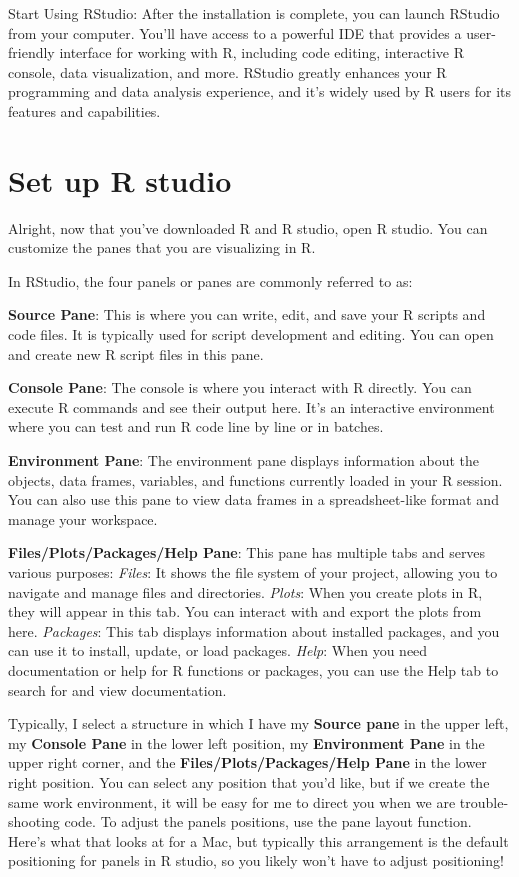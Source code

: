 \documentclass[
]{book}
\begin{document}
Start Using RStudio: After the installation is complete, you can launch RStudio from your computer. You'll have access to a powerful IDE that provides a user-friendly interface for working with R, including code editing, interactive R console, data visualization, and more. RStudio greatly enhances your R programming and data analysis experience, and it's widely used by R users for its features and capabilities.

\hypertarget{set-up-r-studio}{%
\section{Set up R studio}\label{set-up-r-studio}}

Alright, now that you've downloaded R and R studio, open R studio. You can customize the panes that you are visualizing in R.

In RStudio, the four panels or panes are commonly referred to as:

\textbf{Source Pane}: This is where you can write, edit, and save your R scripts and code files. It is typically used for script development and editing. You can open and create new R script files in this pane.

\textbf{Console Pane}: The console is where you interact with R directly. You can execute R commands and see their output here. It's an interactive environment where you can test and run R code line by line or in batches.

\textbf{Environment Pane}: The environment pane displays information about the objects, data frames, variables, and functions currently loaded in your R session. You can also use this pane to view data frames in a spreadsheet-like format and manage your workspace.

\textbf{Files/Plots/Packages/Help Pane}: This pane has multiple tabs and serves various purposes:
\emph{Files}: It shows the file system of your project, allowing you to navigate and manage files and directories.
\emph{Plots}: When you create plots in R, they will appear in this tab. You can interact with and export the plots from here.
\emph{Packages}: This tab displays information about installed packages, and you can use it to install, update, or load packages.
\emph{Help}: When you need documentation or help for R functions or packages, you can use the Help tab to search for and view documentation.

Typically, I select a structure in which I have my \textbf{Source pane} in the upper left, my \textbf{Console Pane} in the lower left position, my \textbf{Environment Pane} in the upper right corner, and the \textbf{Files/Plots/Packages/Help Pane} in the lower right position. You can select any position that you'd like, but if we create the same work environment, it will be easy for me to direct you when we are trouble-shooting code. To adjust the panels positions, use the pane layout function. Here's what that looks at for a Mac, but typically this arrangement is the default positioning for panels in R studio, so you likely won't have to adjust positioning!
\end{document}
